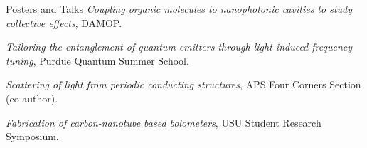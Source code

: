 \begin{rubric}{Posters and Talks}
\entry*[June 2023]%
\emph{Coupling organic molecules to nanophotonic cavities to study collective effects}, DAMOP.\par

\entry*[Apr 2023]%
\emph{Tailoring the entanglement of quantum emitters through light-induced frequency tuning}, Purdue Quantum Summer School.\par

\entry*[Oct 2021]%
\emph{Scattering of light from periodic conducting structures}, APS Four Corners Section (co-author).\par

\entry*[Apr 2019]%
\emph{Fabrication of carbon-nanotube based bolometers}, USU Student Research Symposium.\par

\end{rubric}
